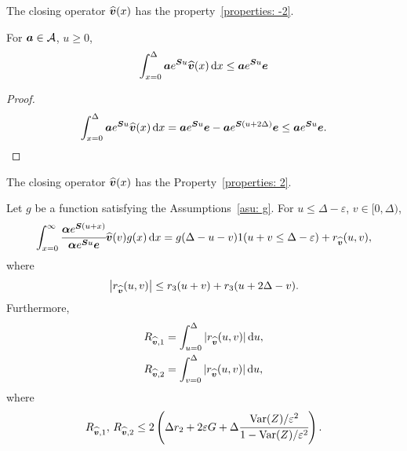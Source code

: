 \begin{lem}
	The closing operator \(\widehat{\boldsymbol v}(x)\) has the property~\ref{properties: -2}. 
	
	For \(\boldsymbol a\in\mathcal A\), \(u\geq 0\), 
	\[\int_{x=0}^\Delta \boldsymbol a e^{\boldsymbol Su}\widehat{\boldsymbol v}(x)\, \mathrm{d} x\leq\boldsymbol ae^{\boldsymbol Su}\boldsymbol e\]
\end{lem}
\begin{proof}
	\[\int_{x=0}^\Delta \boldsymbol a e^{\boldsymbol Su}\widehat{\boldsymbol v}(x)\, \mathrm{d} x=\boldsymbol ae^{\boldsymbol Su}\boldsymbol e-\boldsymbol ae^{\boldsymbol S(u+2\Delta)}\boldsymbol e\leq \boldsymbol ae^{\boldsymbol Su}\boldsymbol e.\]
\end{proof}

\begin{cor}\label{cor: cond bnd 2 U}
	The closing operator \(\widehat{\boldsymbol v}(x)\) has the Property~\ref{properties: 2}.

	Let \(g\) be a function satisfying the Assumptions~\ref{asu: g}. For \(u\leq \Delta-\varepsilon \), \(v\in[ 0,\Delta)\), 
	\[\int_{x=0}^\infty \cfrac{\boldsymbol \alpha  e^{\boldsymbol{S} (u+x)} }{\boldsymbol \alpha  e^{\boldsymbol{S} u} \boldsymbol e} {\widehat{\boldsymbol v}}(v)g(x)\, \mathrm{d} x = g(\Delta-u-v) 1(u+v\leq\Delta-\varepsilon) + r_{\widehat{\boldsymbol v}} (u,v),\]
	where 
	\[\left|r_{\widehat{\boldsymbol v}} (u,v)\right|\leq r_3 (u+v) + r_3 (u+2\Delta - v).\]
	Furthermore,  
	\begin{align*}
		R_{{\widehat{\boldsymbol v}},1}&=\int_{u=0}^{\Delta}| r_{\widehat{\boldsymbol v}}(u,v)|\, \mathrm{d} u,
		\\R_{{\widehat{\boldsymbol v}},2}&=\int_{v=0}^{\Delta}| r_{\widehat{\boldsymbol v}}(u,v)|\, \mathrm{d} u,
	\end{align*}
	where 
	\[R_{{\widehat{\boldsymbol v}},1},\, R_{{\widehat{\boldsymbol v}},2} \leq 2\left(\Delta r_2 + 2\varepsilon G + \Delta\cfrac{\mathrm{Var}(Z)/\varepsilon^2}{1-\mathrm{Var}(Z)/\varepsilon^2}\right).\]
\end{cor}
